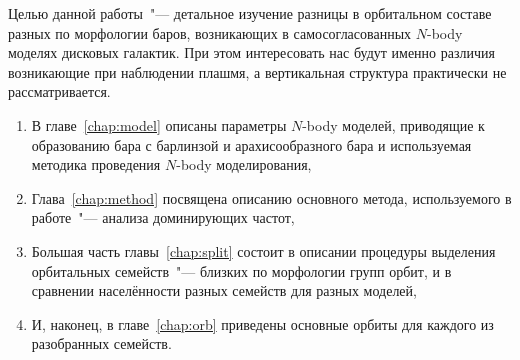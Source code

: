 \documentclass{trlnotes}
\begin{document}
Целью данной работы~"--- детальное изучение разницы в орбитальном составе разных по морфологии баров, возникающих
в самосогласованных $N$-body моделях дисковых галактик. При этом интересовать нас будут именно различия
возникающие при наблюдении плашмя, а вертикальная структура практически не рассматривается. 
\begin{enumerate}
  \item В главе~\ref{chap:model} описаны параметры $N$-body моделей, приводящие к образованию бара с барлинзой и
    арахисообразного бара и используемая методика проведения $N$-body моделирования,
  \item Глава~\ref{chap:method} посвящена описанию основного метода, используемого в работе~"--- анализа
    доминирующих частот,
  \item Большая часть главы~\ref{chap:split} состоит в описании процедуры выделения орбитальных семейств~"---
    близких по морфологии групп орбит, и в сравнении населённости разных семейств для разных моделей, 
  \item И, наконец, в главе~\ref{chap:orb} приведены основные орбиты для каждого из разобранных семейств.
\end{enumerate}
\end{document}
